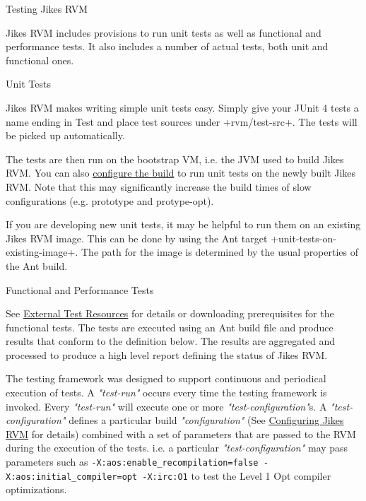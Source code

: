 \begin{section}{Testing Jikes RVM}
\label{sec:testingjikesrvm}

Jikes RVM includes provisions to run unit tests as well as functional and performance tests. It also includes a number of actual tests, both unit and functional ones.

\begin{subsection}{Unit Tests}

Jikes RVM makes writing simple unit tests easy. Simply give your JUnit 4 tests a name ending in Test and place test sources under \spverb+rvm/test-src+. The tests will be picked up automatically.

The tests are then run on the bootstrap VM, i.e. the JVM used to build Jikes RVM. You can also \hyperref[sec:buildingjikesrvm]{configure the build} to run unit tests on the newly built Jikes RVM. Note that this may significantly increase the build times of slow configurations (e.g. prototype and protype-opt).

If you are developing new unit tests, it may be helpful to run them on an existing Jikes RVM image. This can be done by using the Ant target \spverb+unit-tests-on-existing-image+. The path for the image is determined by the usual properties of the Ant build.
\end{subsection}

\begin{subsection}{Functional and Performance Tests}

See \hyperref[sec:externaltestresources]{External Test Resources} for details or downloading prerequisites for the functional tests. The tests are executed using an Ant build file and produce results that conform to the definition below. The results are aggregated and processed to produce a high level report defining the status of Jikes RVM.

The testing framework was designed to support continuous and periodical execution of tests. A \textit{"test-run"} occurs every time the testing framework is invoked. Every \textit{"test-run"} will execute one or more \textit{"test-configuration"}s. A \textit{"test-configuration"} defines a particular build \textit{"configuration"} (See \hyperref[sec:configuringjikesrvm]{Configuring Jikes RVM} for details) combined with a set of parameters that are passed to the RVM during the execution of the tests. i.e. a particular \textit{"test-configuration"} may pass parameters such as \texttt{-X:aos:enable\_recompilation=false -X:aos:initial\_compiler=opt -X:irc:O1} to test the Level 1 Opt compiler optimizations.


\end{subsection}
\end{section}
